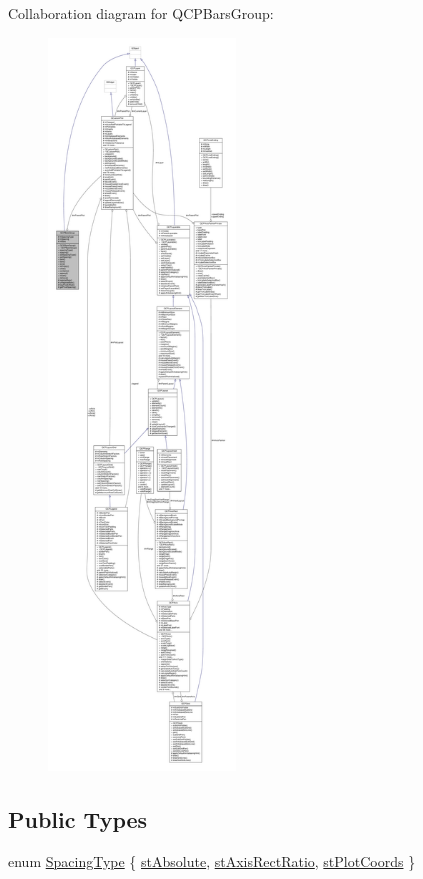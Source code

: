 Collaboration diagram for Q\+C\+P\+Bars\+Group\+:\nopagebreak
\begin{figure}[H]
\begin{center}
\leavevmode
\includegraphics[height=550pt]{class_q_c_p_bars_group__coll__graph}
\end{center}
\end{figure}
\subsection*{Public Types}
\begin{DoxyCompactItemize}
\item 
enum \hyperlink{class_q_c_p_bars_group_a4c0521120a97e60bbca37677a37075b6}{Spacing\+Type} \{ \hyperlink{class_q_c_p_bars_group_a4c0521120a97e60bbca37677a37075b6ab53fa3efaf14867dd0f14d41d64e42ac}{st\+Absolute}, 
\hyperlink{class_q_c_p_bars_group_a4c0521120a97e60bbca37677a37075b6ae94b05c27bc985dcdd8b1e1b7f163d26}{st\+Axis\+Rect\+Ratio}, 
\hyperlink{class_q_c_p_bars_group_a4c0521120a97e60bbca37677a37075b6ad369cee6287e0a86e8c2b643a3168c54}{st\+Plot\+Coords}
 \}
\end{DoxyCompactItemize}
